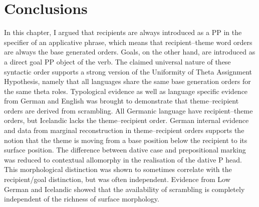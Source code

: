 \section{Conclusions}
	In this chapter, I argued that recipients are always introduced as a PP in the specifier of an applicative phrase, which means that recipient--theme word orders are always the base generated orders. Goals, on the other hand, are introduced as a direct goal PP object of the verb. The claimed universal nature of these syntactic order supports a strong version of the Uniformity of Theta Assignment Hypothesis, namely that all languages share the same base generation orders for the same theta roles.
	Typological evidence as well as language specific evidence from German and English was brought to demonstrate that theme--recipient orders are derived from scrambling. All Germanic language have recipient--theme orders, but Icelandic lacks the theme--recipient order. German internal evidence and data from marginal reconstruction in theme--recipient orders supports the notion that the theme is moving from a base position below the recipient to its surface position.
	The difference between dative case and prepositional marking was reduced to contextual allomorphy in the realisation of the dative P head. This morphological distinction was shown to sometimes correlate with the recipient/goal distinction, but was often independent. Evidence from Low German and Icelandic showed that the availability of scrambling is completely independent of the richness of surface morphology.

%

